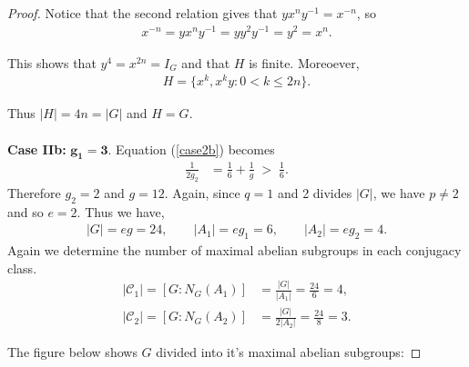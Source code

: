 \begin{proof}
Notice that the second relation gives that $y x^n y^{-1} = x^{-n}$, so
\begin{align*} x^{-n} = y x^n y^{-1} = y y^2 y^{-1} = y^2 = x^n.
\end{align*}

This shows that $y^4 = x^{2n} = I_G$ and that $H$ is finite. Moreoever,
\begin{align*} H = \{ x^k, x^ky :  0 < k \leq 2n \}.
\end{align*}

 Thus $|H| = 4n = |G|$ and $H = G$. \\
\\
 \space \textbf{Case IIb:} $\pmb{g_1 = 3}$.  Equation (\ref{case2b}) becomes
\begin{align*} \frac{1}{2g_2} &= \frac{1}{6} + \frac{1}{g} \; > \; \frac{1}{6}.
\end{align*}
Therefore $g_2 = 2$ and $g = 12$. Again, since $q=1$ and 2 divides $|G|$, we have $p \neq 2$ and so $e = 2$. Thus we have,
\begin{align*} |G| = eg = 24, \qquad |A_1| = eg_1 = 6, \qquad |A_2| = eg_2 = 4.
\end{align*}
Again we determine the number of maximal abelian subgroups in each conjugacy class.
\begin{align*}  |\mathcal{C}_1| = [G:N_G(A_1)] &= \frac{|G|}{|A_1|} = \frac{24}{6} = 4, 
\\[1.5ex] |\mathcal{C}_2| = [G:N_G(A_2)] &= \frac{|G|}{2|A_2|} = \frac{24}{8} = 3.
\end{align*}

\newpage
The figure below shows $G$ divided into it's maximal abelian subgroups:







\end{proof}
